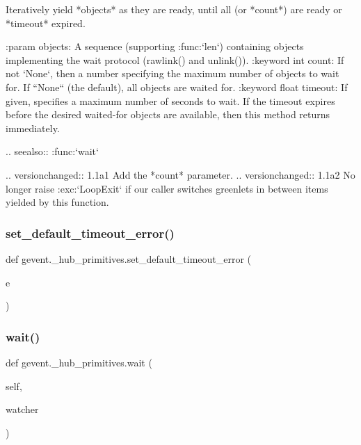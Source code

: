 \begin{DoxyVerb}Iteratively yield *objects* as they are ready, until all (or *count*) are ready
or *timeout* expired.

:param objects: A sequence (supporting :func:`len`) containing objects
    implementing the wait protocol (rawlink() and unlink()).
:keyword int count: If not `None`, then a number specifying the maximum number
    of objects to wait for. If ``None`` (the default), all objects
    are waited for.
:keyword float timeout: If given, specifies a maximum number of seconds
    to wait. If the timeout expires before the desired waited-for objects
    are available, then this method returns immediately.

.. seealso:: :func:`wait`

.. versionchanged:: 1.1a1
   Add the *count* parameter.
.. versionchanged:: 1.1a2
   No longer raise :exc:`LoopExit` if our caller switches greenlets
   in between items yielded by this function.
\end{DoxyVerb}
 \mbox{\label{namespacegevent_1_1__hub__primitives_ae92cc5ba65b855482653a2f9592ee847}} 
\subsubsection{\texorpdfstring{set\+\_\+default\+\_\+timeout\+\_\+error()}{set\_default\_timeout\_error()}}
{\footnotesize\ttfamily def gevent.\+\_\+hub\+\_\+primitives.\+set\+\_\+default\+\_\+timeout\+\_\+error (\begin{DoxyParamCaption}\item[{}]{e }\end{DoxyParamCaption})}

\mbox{\label{namespacegevent_1_1__hub__primitives_aca76d6a00bb3e30192d61faa90f10e9d}} 
\subsubsection{\texorpdfstring{wait()}{wait()}}
{\footnotesize\ttfamily def gevent.\+\_\+hub\+\_\+primitives.\+wait (\begin{DoxyParamCaption}\item[{}]{self,  }\item[{}]{watcher }\end{DoxyParamCaption})}

